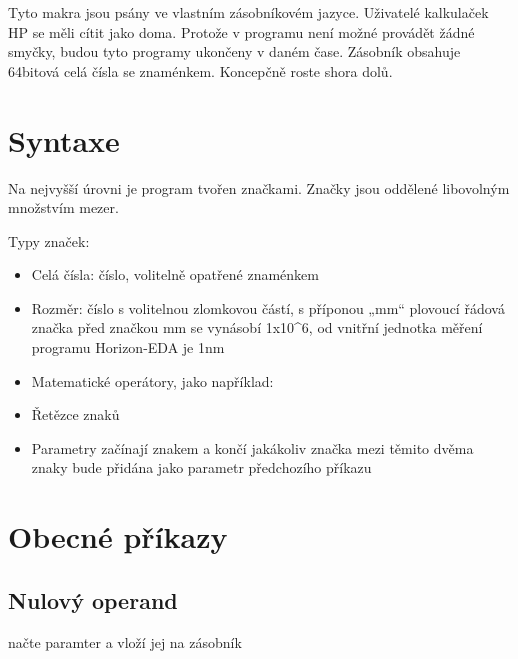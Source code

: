 \documentclass[letterpaper,10pt,czech]{sphinxmanual}
\begin{document}
Tyto makra jsou psány ve vlastním zásobníkovém jazyce. Uživatelé kalkulaček HP se měli cítit jako doma. Protože v programu není možné provádět žádné smyčky, budou tyto programy ukončeny v daném čase. Zásobník obsahuje 64bitová celá čísla se znaménkem. Koncepčně roste shora dolů.


\section{Syntaxe}
\label{\detokenize{parameter-programs_cz:syntaxe}}
Na nejvyšší úrovni je program tvořen značkami. Značky jsou oddělené libovolným množstvím mezer.

Typy značek:
\begin{itemize}
\item {} 
Celá čísla: číslo, volitelně opatřené znaménkem

\item {} 
Rozměr: číslo s volitelnou zlomkovou částí, s příponou „mm“ plovoucí řádová značka před značkou mm se vynásobí 1x10\textasciicircum{}6, od vnitřní jednotka měření programu Horizon-EDA je 1nm

\item {} 
Matematické operátory, jako například: \sphinxcode{\sphinxupquote{+ - * /}}

\item {} 
Řetězce znaků

\item {} 
Parametry začínají znakem \sphinxcode{\sphinxupquote{{[}}} a končí \sphinxcode{\sphinxupquote{{]}}} jakákoliv značka mezi těmito dvěma znaky bude přidána jako parametr předchozího příkazu

\end{itemize}


\section{Obecné příkazy}
\label{\detokenize{parameter-programs_cz:obecne-prikazy}}

\subsection{Nulový operand}
\label{\detokenize{parameter-programs_cz:nulovy-operand}}
 načte paramter a vloží jej na zásobník
\end{document}
